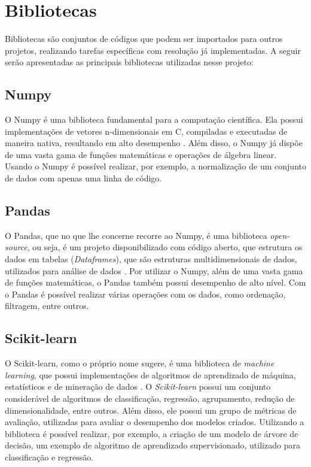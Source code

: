     \section{Bibliotecas}

    Bibliotecas são conjuntos de códigos que podem ser importados para outros projetos, realizando tarefas específicas com resolução já implementadas. A seguir serão apresentadas as principais bibliotecas utilizadas nesse projeto:

    \subsection{Numpy}

    O Numpy é uma biblioteca fundamental para a computação científica. Ela possui implementações de vetores n-dimensionais em C, compiladas e executadas de maneira nativa, resultando em alto desempenho \cite{numpy}. Além disso, o Numpy já dispõe de uma vasta gama de funções matemáticas e operações de álgebra linear. Usando o Numpy é possível realizar, por exemplo, a normalização de um conjunto de dados com apenas uma linha de código.

    \subsection{Pandas}

    O Pandas, que no que lhe concerne recorre ao Numpy, é uma biblioteca \textit{open-source}, ou seja, é um projeto disponibilizado com código aberto, que estrutura os dados em tabelas (\textit{Dataframes}), que são estruturas multidimensionais de dados, utilizados para análise de dados \cite{pandas}. Por utilizar o Numpy, além de uma vasta gama de funções matemáticas, o Pandas também possui desempenho de alto nível. Com o Pandas é possível realizar várias operações com os dados, como ordenação, filtragem, entre outros.

    \subsection{Scikit-learn}

    O Scikit-learn, como o próprio nome sugere, é uma biblioteca de \textit{machine learning}, que possui implementações de algoritmos de aprendizado de máquina, estatísticos e de mineração de dados \cite{scikit-learn2022}. O \textit{Scikit-learn} possui um conjunto considerável de algoritmos de classificação, regressão, agrupamento, redução de dimensionalidade, entre outros. Além disso, ele possui um grupo de métricas de avaliação, utilizadas para avaliar o desempenho dos modelos criados. Utilizando a biblioteca é possível realizar, por exemplo, a criação de um modelo de árvore de decisão, um exemplo de algoritmo de aprendizado supervisionado, utilizado para classificação e regressão.

